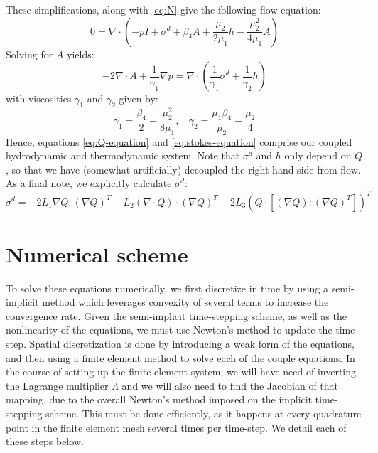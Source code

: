 \documentclass[reqno]{article}
\begin{document}
  These simplifications, along with \eqref{eq:N} give the following flow equation:
  \begin{equation}
    0
    =
    \nabla \cdot \left(
      -p I
      + \sigma^d
      + \beta_4 A
      + \frac{\mu_2}{2 \mu_1} h - \frac{\mu_2^2}{4 \mu_1} A
    \right)
  \end{equation}
  Solving for $A$ yields:
  \begin{equation} \label{eq:stokes-equation}
    -2 \nabla \cdot A + \frac{1}{\gamma_1} \nabla p
    =
    \nabla \cdot \left(
      \frac{1}{\gamma_1} \sigma^d
      + \frac{1}{\gamma_2} h
    \right)
  \end{equation}
  with viscosities $\gamma_1$ and $\gamma_2$ given by:
  \begin{equation}
    \gamma_1
    =
    \frac{\beta_4}{2} - \frac{\mu_2^2}{8 \mu_1},
    \:\:\:\:
    \gamma_2
    =
    \frac{\mu_1 \beta_4}{\mu_2} - \frac{\mu_2}{4}
  \end{equation}
  Hence, equations \eqref{eq:Q-equation} and \eqref{eq:stokes-equation} comprise
  our coupled hydrodynamic and thermodynamic system.
  Note that $\sigma^d$ and $h$ only depend on $Q$, so that we have (somewhat
  artificially) decoupled the right-hand side from flow.
  As a final note, we explicitly calculate $\sigma^d$:
  \begin{equation}
    \sigma^d
    =
    - 2 L_1 \nabla Q : \left( \nabla Q \right)^T
    - L_2 \left( \nabla \cdot Q \right) \cdot \left( \nabla Q \right)^T
    - 2 L_3 \left( Q \cdot \left[ \left( \nabla Q \right) : \left( \nabla Q \right)^T \right] \right)^T
  \end{equation}
  
  \section{Numerical scheme} \label{numerical-scheme}
  To solve these equations numerically, we first discretize in time by using a
  semi-implicit method which leverages convexity of several terms to increase
  the convergence rate.
  Given the semi-implicit time-stepping scheme, as well as the nonlinearity of
  the equations, we must use Newton's method to update the time step.
  Spatial discretization is done by introducing a weak form of the equations,
  and then using a finite element method to solve each of the couple equations.
  In the course of setting up the finite element system, we will have need of
  inverting the Lagrange multiplier $\Lambda$ and we will also need to find the
  Jacobian of that mapping, due to the overall Newton's method imposed on the
  implicit time-stepping scheme.
  This must be done efficiently, as it happens at every quadrature point in the
  finite element mesh several times per time-step.
  We detail each of these steps below.
\end{document}
